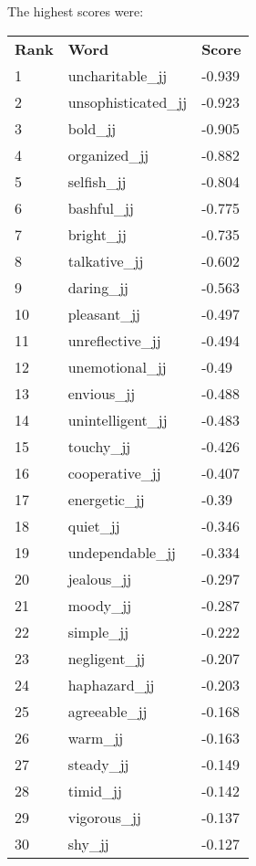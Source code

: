 \documentclass[10pt,letterpaper]{book}
\begin{document}
The highest scores were:
\begin{tabular}{ l l l }
        \textbf{Rank} & \textbf{Word} & \textbf{Score} \\
        1 & uncharitable\_jj & -0.939 \\
        2 & unsophisticated\_jj & -0.923 \\
        3 & bold\_jj & -0.905 \\
        4 & organized\_jj & -0.882 \\
        5 & selfish\_jj & -0.804 \\
        6 & bashful\_jj & -0.775 \\
        7 & bright\_jj & -0.735 \\
        8 & talkative\_jj & -0.602 \\
        9 & daring\_jj & -0.563 \\
        10 & pleasant\_jj & -0.497 \\
        11 & unreflective\_jj & -0.494 \\
        12 & unemotional\_jj & -0.49 \\
        13 & envious\_jj & -0.488 \\
        14 & unintelligent\_jj & -0.483 \\
        15 & touchy\_jj & -0.426 \\
        16 & cooperative\_jj & -0.407 \\
        17 & energetic\_jj & -0.39 \\
        18 & quiet\_jj & -0.346 \\
        19 & undependable\_jj & -0.334 \\
        20 & jealous\_jj & -0.297 \\
        21 & moody\_jj & -0.287 \\
        22 & simple\_jj & -0.222 \\
        23 & negligent\_jj & -0.207 \\
        24 & haphazard\_jj & -0.203 \\
        25 & agreeable\_jj & -0.168 \\
        26 & warm\_jj & -0.163 \\
        27 & steady\_jj & -0.149 \\
        28 & timid\_jj & -0.142 \\
        29 & vigorous\_jj & -0.137 \\
        30 & shy\_jj & -0.127 \\
\end{tabular}
\end{document}
